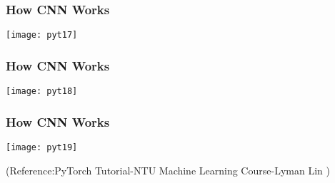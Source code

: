 \begin{frame}[fragile] \frametitle{How CNN Works}
\begin{center}
\texttt{[image: pyt17]}
\end{center}

\end{frame}

\begin{frame}[fragile] \frametitle{How CNN Works}
\begin{center}
\texttt{[image: pyt18]}
\end{center}

\end{frame}

\begin{frame}[fragile] \frametitle{How CNN Works}
\begin{center}
\texttt{[image: pyt19]}
\end{center}
\tiny{(Reference:PyTorch Tutorial-NTU Machine Learning Course-Lyman Lin )}
\end{frame}
